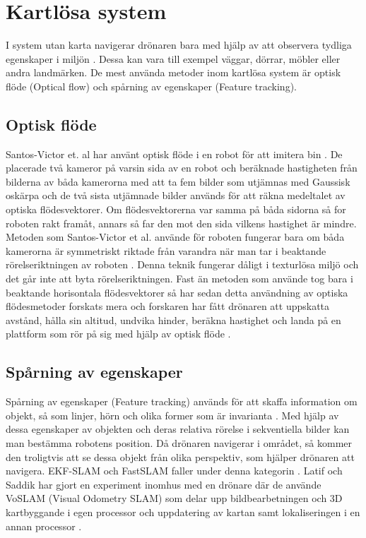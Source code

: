 \section{Kartlösa system}

I system utan karta navigerar drönaren bara med hjälp av att observera tydliga egenskaper i miljön \citep{982903}. Dessa kan vara till exempel väggar, dörrar, möbler eller andra landmärken. De mest använda metoder inom kartlösa system är optisk flöde (Optical flow) och spårning av egenskaper (Feature tracking). 

\subsection{Optisk flöde}

Santos-Victor et. al har använt optisk flöde i en robot för att imitera bin \citep{341094}. De placerade två kameror på varsin sida av en robot och beräknade hastigheten från bilderna av båda kamerorna med att ta fem bilder som utjämnas med Gaussisk oskärpa och de två sista utjämnade bilder används för att räkna medeltalet av optiska flödesvektorer. Om flödesvektorerna var samma på båda sidorna så for roboten rakt framåt, annars så far den mot den sida vilkens hastighet är mindre. Metoden som Santos-Victor et al. använde för roboten fungerar bara om båda kamerorna är symmetriskt riktade från varandra när man tar i beaktande rörelseriktningen av roboten \citep{982903}. Denna teknik fungerar dåligt i texturlösa miljö och det går inte att byta rörelseriktningen. Fast än metoden som \cite{341094} använde tog bara i beaktande horisontala flödesvektorer så har sedan detta användning av optiska flödesmetoder forskats mera och forskaren har fått drönaren att uppskatta avstånd, hålla sin altitud, undvika hinder, beräkna hastighet och landa på en plattform som rör på sig med hjälp av optisk flöde \citep{6564752}.

\subsection{Spårning av egenskaper}

Spårning av egenskaper (Feature tracking) används för att skaffa information om objekt, så som linjer, hörn och olika former som är invarianta \citep{geospatial}. Med hjälp av dessa egenskaper av objekten och deras relativa rörelse i sekventiella bilder kan man bestämma robotens position. Då drönaren navigerar i området, så kommer den troligtvis att se dessa objekt från olika perspektiv, som hjälper drönaren att navigera. EKF-SLAM och FastSLAM faller under denna kategorin \citep{8930783}. Latif och Saddik har gjort en experiment inomhus med en drönare där de använde VoSLAM (Visual Odometry SLAM) som delar upp bildbearbetningen och 3D kartbyggande i egen processor och uppdatering av kartan samt lokaliseringen i en annan processor \citep{8930783}.

